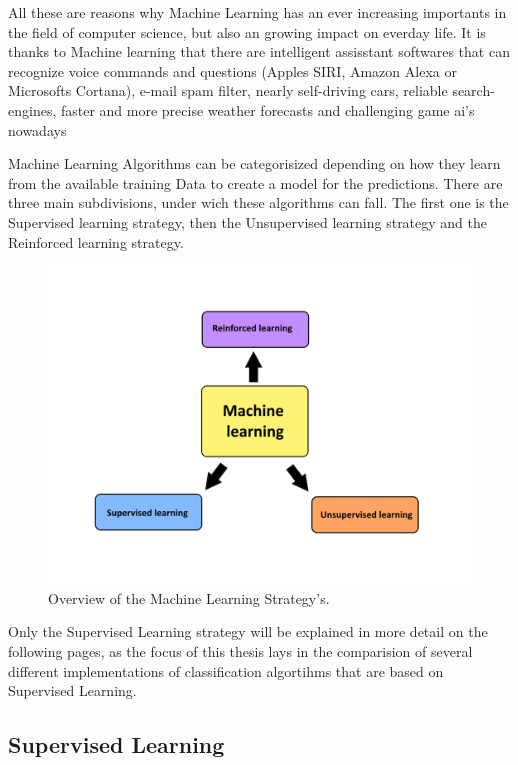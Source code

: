 \documentclass[12pt,oneside,a4paper,parskip]{scrbook}
\begin{document}
All these are reasons why Machine Learning has an ever increasing importants in the field of computer science, 
but also an growing impact on everday life. It is thanks to Machine learning that there are intelligent assisstant 
softwares that can recognize voice commands and questions (Apples SIRI, Amazon Alexa or Microsofts Cortana),
e-mail spam filter, nearly self-driving cars, reliable search-engines, faster and more precise weather forecasts and 
challenging game ai's nowadays 

Machine Learning Algorithms can be categorisized depending on how they learn from the available training Data to create 
a model for the predictions. There are three main subdivisions, under wich these algorithms can fall. 
The first one is the Supervised learning strategy, then the Unsupervised learning strategy and the Reinforced learning 
strategy. 

\begin{figure}
  \includegraphics[width=\linewidth]{Overview_ml}
  \caption{Overview of the Machine Learning Strategy's.}
  \label{fig:overview_ML}
\end{figure}

Only the Supervised Learning strategy will be explained in more detail on the following pages, as the focus of this 
thesis lays in the comparision of several different implementations of classification algortihms that are based on 
Supervised Learning.
 

\cite{IntroML}

\subsection{Supervised Learning}
\end{document}

